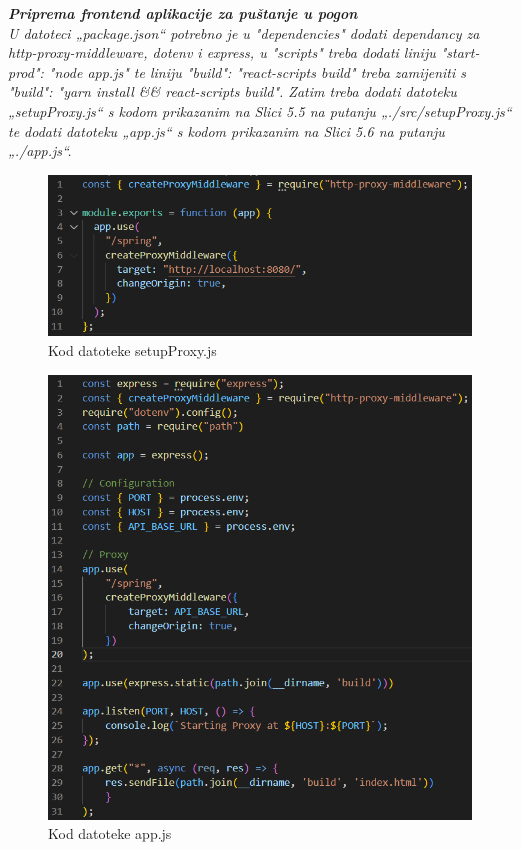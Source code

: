        	\bigskip
       	\bigskip
       	
    \textbf{\textit{Priprema frontend aplikacije za puštanje u pogon}}\\
 
    \textit{U datoteci „package.json“ potrebno je u "dependencies" dodati dependancy za http-proxy-middleware, dotenv i express, u "scripts" treba dodati liniju "start-prod": "node app.js" te liniju "build": "react-scripts build" treba zamijeniti s "build": "yarn install \textnormal{\&\&} react-scripts build". Zatim treba dodati datoteku „setupProxy.js“ s kodom prikazanim na Slici 5.5 na putanju „./src/setupProxy.js“ te dodati datoteku „app.js“ s kodom prikazanim na Slici 5.6 na putanju „./app.js“.}
    \bigskip
		    \begin{figure}[H]
		    	\centering
		    	\includegraphics[width=\textwidth]{slike/deployment/slika4.png}
		    	\caption{Kod datoteke setupProxy.js}
		    	\label{fig:my_label}
		    \end{figure}
		
		 \begin{figure}[H]
			\centering
			\includegraphics[width=\textwidth]{slike/deployment/slika5.png}
			\caption{Kod datoteke app.js}
			\label{fig:my_label}
		\end{figure}
	
